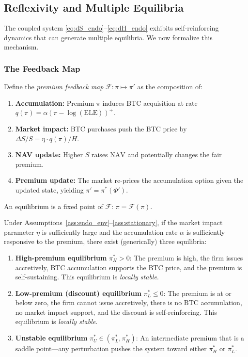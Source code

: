 \subsection{Reflexivity and Multiple Equilibria}\label{subsec:reflexivity}

The coupled system \eqref{eq:dS_endo}--\eqref{eq:dH_endo} exhibits
self-reinforcing dynamics that can generate multiple equilibria.  We now
formalize this mechanism.

\subsubsection{The Feedback Map}

\begin{definition}\label{def:feedback_map}
Define the \emph{premium feedback map}
$\mathcal{F}: \pi \mapsto \pi'$ as the composition of:
\begin{enumerate}
  \item \textbf{Accumulation:} Premium $\pi$ induces BTC acquisition at
    rate $q(\pi) = \alpha(\pi - \log(\mathrm{ELE}))^+$.
  \item \textbf{Market impact:} BTC purchases push the BTC price by
    $\Delta S / S = \eta \cdot q(\pi) / H$.
  \item \textbf{NAV update:} Higher $S$ raises $\mathrm{NAV}$ and
    potentially changes the fair premium.
  \item \textbf{Premium update:} The market re-prices the accumulation
    option given the updated state, yielding $\pi' = \pi^*(\Phi')$.
\end{enumerate}
An equilibrium is a fixed point of $\mathcal{F}$: $\pi = \mathcal{F}(\pi)$.
\end{definition}

\begin{theorem}\label{thm:multiple_eq}
Under Assumptions~\ref{ass:endo_env}--\ref{ass:stationary}, if the market
impact parameter $\eta$ is sufficiently large and the accumulation rate
$\alpha$ is sufficiently responsive to the premium, there exist (generically)
three equilibria:
\begin{enumerate}
  \item \textbf{High-premium equilibrium} $\pi_H^* > 0$: The premium is
    high, the firm issues accretively, BTC accumulation supports the BTC
    price, and the premium is self-sustaining.  This equilibrium is
    \emph{locally stable}.
  \item \textbf{Low-premium (discount) equilibrium} $\pi_L^* \le 0$: The
    premium is at or below zero, the firm cannot issue accretively, there is
    no BTC accumulation, no market impact support, and the discount is
    self-reinforcing.  This equilibrium is \emph{locally stable}.
  \item \textbf{Unstable equilibrium} $\pi_U^* \in (\pi_L^*, \pi_H^*)$:
    An intermediate premium that is a saddle point---any perturbation pushes
    the system toward either $\pi_H^*$ or $\pi_L^*$.
\end{enumerate}
\end{theorem}

